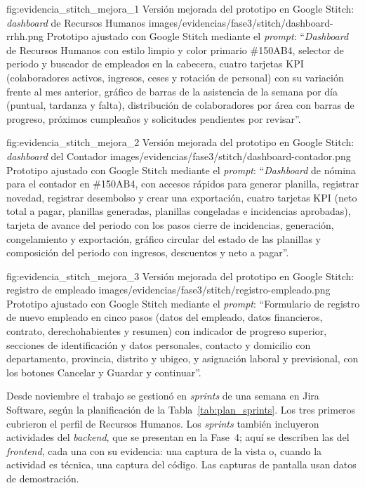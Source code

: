 \figuraEvidencia
    {fig:evidencia_stitch_mejora_1}
    {Versión mejorada del prototipo en Google Stitch: \textit{dashboard} de Recursos Humanos}
    {images/evidencias/fase3/stitch/dashboard-rrhh.png}
    {Prototipo ajustado con Google Stitch mediante el \textit{prompt}: 
    ``\textit{Dashboard} de Recursos Humanos con estilo limpio y color primario \#150AB4, selector de periodo y buscador de empleados en la cabecera, 
    cuatro tarjetas KPI (colaboradores activos, ingresos, ceses y rotación de personal) con su variación frente al mes anterior, 
    gráfico de barras de la asistencia de la semana por día (puntual, tardanza y falta), distribución de colaboradores por área con barras de progreso, 
    próximos cumpleaños y solicitudes pendientes por revisar''.}

\figuraEvidencia
    {fig:evidencia_stitch_mejora_2}
    {Versión mejorada del prototipo en Google Stitch: \textit{dashboard} del Contador}
    {images/evidencias/fase3/stitch/dashboard-contador.png}
    {Prototipo ajustado con Google Stitch mediante el \textit{prompt}: 
    ``\textit{Dashboard} de nómina para el contador en \#150AB4, con accesos rápidos para generar planilla, registrar novedad, registrar desembolso y crear una exportación, 
    cuatro tarjetas KPI (neto total a pagar, planillas generadas, planillas congeladas e incidencias aprobadas), 
    tarjeta de avance del periodo con los pasos cierre de incidencias, generación, congelamiento y exportación, 
    gráfico circular del estado de las planillas y composición del periodo con ingresos, descuentos y neto a pagar''.}

\figuraEvidencia
    {fig:evidencia_stitch_mejora_3}
    {Versión mejorada del prototipo en Google Stitch: registro de empleado}
    {images/evidencias/fase3/stitch/registro-empleado.png}
    {Prototipo ajustado con Google Stitch mediante el \textit{prompt}: 
    ``Formulario de registro de nuevo empleado en cinco pasos (datos del empleado, datos financieros, contrato, derechohabientes y resumen) 
    con indicador de progreso superior, secciones de identificación y datos personales, contacto y domicilio con departamento, provincia, distrito y ubigeo, 
    y asignación laboral y previsional, con los botones Cancelar y Guardar y continuar''.}

Desde noviembre el trabajo se gestionó en \textit{sprints} de una semana en Jira Software,
según la planificación de la Tabla~\ref{tab:plan_sprints}.
Los tres primeros cubrieron el perfil de Recursos Humanos.
Los \textit{sprints} también incluyeron actividades del \textit{backend}, que se presentan en la Fase~4; 
aquí se describen las del \textit{frontend}, cada una con su evidencia: 
una captura de la vista o, cuando la actividad es técnica, una captura del código. 
Las capturas de pantalla usan datos de demostración.

